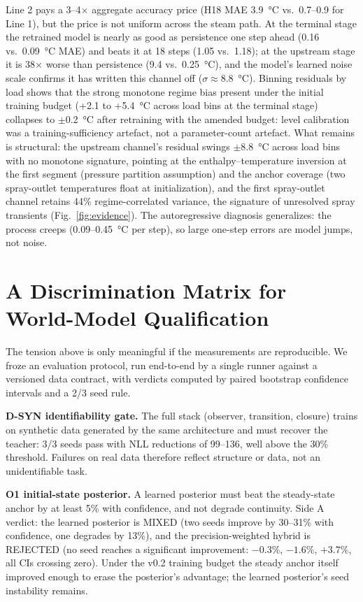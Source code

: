 \documentclass{article}
\begin{document}
Line 2 pays a 3--4$\times$ aggregate accuracy price (H18 MAE
3.9~\si{\degreeCelsius} vs.\ 0.7--0.9 for Line 1), but the price is not uniform
across the steam path. At the terminal stage the retrained model is nearly as good
as persistence one step ahead (0.16 vs.\ 0.09~\si{\degreeCelsius} MAE) and beats it
at 18 steps (1.05 vs.\ 1.18); at the upstream stage it is 38$\times$ worse than
persistence (9.4 vs.\ 0.25~\si{\degreeCelsius}), and the model's learned noise scale
confirms it has written this channel off ($\sigma \approx 8.8$~\si{\degreeCelsius}).
Binning residuals by load shows that the strong monotone regime bias present under
the initial training budget (+2.1 to +5.4~\si{\degreeCelsius} across load bins at the
terminal stage) collapses to $\pm$0.2~\si{\degreeCelsius} after retraining with the
amended budget: level calibration was a training-sufficiency artefact, not a
parameter-count artefact. What remains is structural: the upstream channel's
residual swings $\pm$8.8~\si{\degreeCelsius} across load bins with no monotone
signature, pointing at the enthalpy--temperature inversion at the first segment
(pressure partition assumption) and the anchor coverage (two spray-outlet
temperatures float at initialization), and the first spray-outlet channel retains
44\% regime-correlated variance, the signature of unresolved spray transients
(Fig.~\ref{fig:evidence}). The autoregressive diagnosis generalizes: the process
creeps (0.09--0.45~\si{\degreeCelsius} per step), so large one-step errors are model
jumps, not noise.

\section{A Discrimination Matrix for World-Model Qualification}

The tension above is only meaningful if the measurements are reproducible. We froze an
evaluation protocol, run end-to-end by a single runner against a versioned data
contract, with verdicts computed by paired bootstrap confidence intervals and a 2/3
seed rule.

\textbf{D-SYN identifiability gate.} The full stack (observer, transition, closure)
trains on synthetic data generated by the same architecture and must recover the
teacher: 3/3 seeds pass with NLL reductions of 99--136, well above the 30\% threshold.
Failures on real data therefore reflect structure or data, not an unidentifiable task.

\textbf{O1 initial-state posterior.} A learned posterior must beat the steady-state
anchor by at least 5\% with confidence, and not degrade continuity. Side A verdict:
the learned posterior is MIXED (two seeds improve by 30--31\% with confidence, one
degrades by 13\%), and the precision-weighted hybrid is REJECTED (no seed reaches a
significant improvement: $-0.3\%$, $-1.6\%$, $+3.7\%$, all CIs crossing zero). Under
the v0.2 training budget the steady anchor itself improved enough to erase the
posterior's advantage; the learned posterior's seed instability remains.
\end{document}
